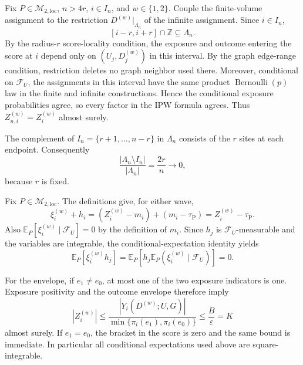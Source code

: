 Fix \(P\in\mathcal M_{2,\mathrm{loc}}\), \(n>4r\), \(i\in I_n\), and \(w\in\{1,2\}\).  Couple the finite-volume assignment to the restriction \(D^{(w)}|_{\Lambda_n}\) of the infinite assignment.  Since \(i\in I_n\),
\[
 [i-r,i+r]\cap\mathbb Z\subseteq\Lambda_n.
\]
By the radius-\(r\) score-locality condition, the exposure and outcome entering the score at \(i\) depend only on \((U_j,D_j^{(w)})\) in this interval.  By the graph edge-range condition, restriction deletes no graph neighbor used there.  Moreover, conditional on \(\mathcal F_U\), the assignments in this interval have the same product \(\operatorname{Bernoulli}(p)\) law in the finite and infinite constructions.  Hence the conditional exposure probabilities agree, so every factor in the IPW formula agrees.  Thus \(Z_{n,i}^{(w)}=Z_i^{(w)}\) almost surely.

The complement of \(I_n=\{r+1,\ldots,n-r\}\) in \(\Lambda_n\) consists of the \(r\) sites at each endpoint.  Consequently
\[
 \frac{|\Lambda_n\setminus I_n|}{|\Lambda_n|}=\frac{2r}{n}\longrightarrow0,
\]
because \(r\) is fixed.

Fix \(P\in\mathcal M_{2,\mathrm{loc}}\).  The definitions give, for either wave,
\[
 \xi_i^{(w)}+h_i=(Z_i^{(w)}-m_i)+(m_i-\tau_{\mathrm P})
 =Z_i^{(w)}-\tau_{\mathrm P}.
\]
Also \(\mathbb E_P[\xi_i^{(w)}\mid\mathcal F_U]=0\) by the definition of \(m_i\).  Since \(h_j\) is \(\mathcal F_U\)-measurable and the variables are integrable, the conditional-expectation identity yields
\[
 \mathbb E_P[\xi_i^{(w)}h_j]
 =\mathbb E_P\!\left[h_j\mathbb E_P(\xi_i^{(w)}\mid\mathcal F_U)\right]=0.
\]

For the envelope, if \(e_1\ne e_0\), at most one of the two exposure indicators is one.  Exposure positivity and the outcome envelope therefore imply
\[
 |Z_i^{(w)}|
 \le \frac{|Y_i(D^{(w)};U,G)|}{\min\{\pi_i(e_1),\pi_i(e_0)\}}
 \le \frac B\varepsilon=K
\]
almost surely.  If \(e_1=e_0\), the bracket in the score is zero and the same bound is immediate.  In particular all conditional expectations used above are square-integrable.

